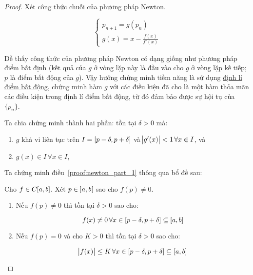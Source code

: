 \documentclass[../../Lectures]{subfiles}
\begin{document}
\begin{proof}
    Xét công thức chuỗi của phương pháp Newton.

    \[\begin{cases}
        p_{n + 1} = g(p_n) \\
        g(x) = x - \frac{f(x)}{f'(x)}
    \end{cases}\]

    Dễ thấy công thức của phương pháp Newton có dạng giống như phương pháp điểm
    bất định (kết quả của \(g\) ở vòng lặp này là đầu vào cho \(g\) ở vòng lặp
    kế tiếp; \(p\) là điểm bất động của \(g\)). Vậy hướng chứng minh tiềm năng
    là sử dụng \hyperref[thm:fixed_point]{định lí điểm bất động}, chứng minh hàm
    \(g\) với các điều kiện đã cho là một hàm thỏa mãn các điều kiện trong định
    lí điểm bất động, từ đó đảm bảo được sự hội tụ của \(\{p_n\}\).

    Ta chia chứng minh thành hai phần: tồn tại \(\delta > 0\) mà:

    \begin{enumerate}
        \item \label{proof:newton_part_1} \(g\) khả vi liên tục trên \(I =
            \interval{p - \delta}{p + \delta}\) và \(\abs{g'(x)} < 1 \, \forall
            x \in I\), và

        \item \label{proof:newton_part_2} \(g(x) \in I \, \forall x \in I\),
    \end{enumerate}

    Ta chứng minh điều~\ref{proof:newton_part_1} thông qua bổ đề sau:

    \begin{lemma}\label{lemma:proof:newton_part_1}
        Cho \(f \in C \interval{a}{b}\). Xét \(p \in \interval[open]{a}{b}\) sao
        cho \(f(p) \neq 0\).

        \begin{enumerate}[label = (\alph*)]
            \item Nếu \(f(p) \neq 0\) thì tồn tại \(\delta > 0\) sao cho:

                \[f(x) \neq 0 \, \forall x \in \interval{p - \delta}{p + \delta} \subseteq \interval{a}{b}\]

            \item Nếu \(f(p) = 0\) và cho \(K > 0\) thì tồn tại \(\delta > 0\) sao cho:

                \[\abs{f(x)} \leq K \, \forall x \in \interval{p - \delta}{p + \delta} \subseteq \interval{a}{b}\]
        \end{enumerate}
    \end{lemma}


\end{proof}
\end{document}
